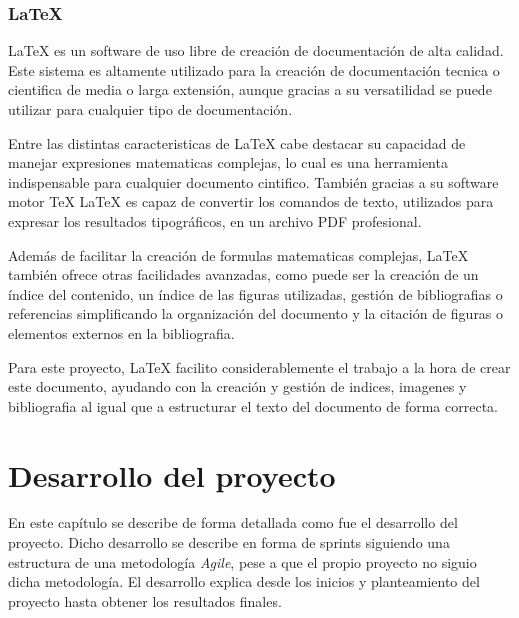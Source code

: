 \documentclass[a4paper, 12pt]{book}
\begin{document}
\subsection{LaTeX}
\label{subsec:latex}

LaTeX \cite{latexproject_about} es un software de uso libre de creación de documentación de alta calidad. Este sistema es altamente utilizado para la creación de documentación tecnica o cientifica de media o larga extensión, aunque gracias a su versatilidad se puede utilizar para cualquier tipo de documentación.

Entre las distintas caracteristicas de LaTeX cabe destacar su capacidad de manejar expresiones matematicas complejas, lo cual es una herramienta indispensable para cualquier documento cintifico. También gracias a su software motor TeX LaTeX es capaz de convertir los comandos de texto, utilizados para expresar los resultados tipográficos, en un archivo PDF profesional. 

Además de facilitar la creación de formulas matematicas complejas, LaTeX también ofrece otras facilidades avanzadas, como puede ser la creación de un índice del contenido, un índice de las figuras utilizadas, gestión de bibliografias o referencias simplificando la organización del documento y la citación de figuras o elementos externos en la bibliografia.

Para este proyecto, LaTeX facilito considerablemente el trabajo a la hora de crear este documento, ayudando con la creación y gestión de indices, imagenes y bibliografia al igual que a estructurar el texto del documento de forma correcta.

\cleardoublepage
\chapter{Desarrollo del proyecto}
\label{chap:Desarrollo del proyecto}
En este capítulo se describe de forma detallada como fue el desarrollo del proyecto. Dicho desarrollo
se describe en forma de sprints siguiendo una estructura de una metodología \textit{Agile}\cite{asana_agile_methodology}, pese a que el propio proyecto no siguio dicha metodología. 
El desarrollo explica desde los inicios y planteamiento del proyecto hasta obtener los resultados finales.
\end{document}
